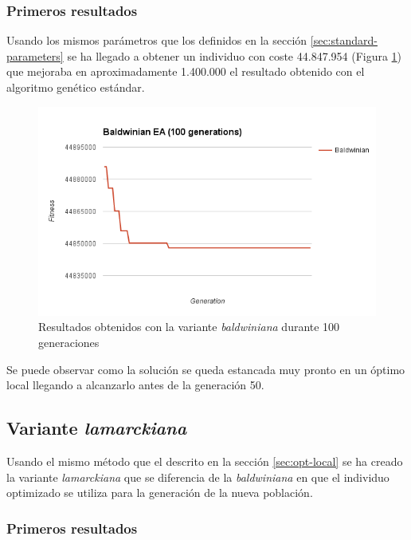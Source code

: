 \subsubsection{Primeros resultados}

Usando los mismos parámetros que los definidos en la sección \ref{sec:standard-parameters} se ha llegado a obtener un individuo con coste 44.847.954 (Figura \ref{fig:baldwinian-ea}) que mejoraba en aproximadamente 1.400.000 el resultado obtenido con el algoritmo genético estándar. 

\begin{figure}[H]
	\centering
	\includegraphics[width=14cm]{img/baldwinian-ea}
	\caption{Resultados obtenidos con la variante \textit{baldwiniana} durante 100 generaciones}
	\label{fig:baldwinian-ea}
\end{figure}

Se puede observar como la solución se queda estancada muy pronto en un óptimo local llegando a alcanzarlo antes de la generación 50.

\subsection{Variante \textit{lamarckiana}}

Usando el mismo método que el descrito en la sección \ref{sec:opt-local} se ha creado la variante \textit{lamarckiana} que se diferencia de la \textit{baldwiniana} en que el individuo optimizado se utiliza para la generación de la nueva población.

\subsubsection{Primeros resultados}

